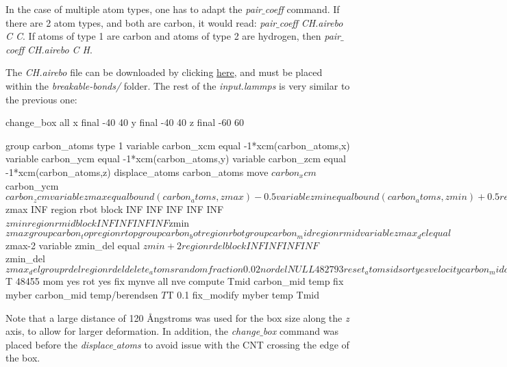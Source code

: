 \begin{tcolorbox}[colback=mylightblue!5!white,colframe=mylightblue!75!black,title=Setting AIREBO pair coefficients]

\vspace{0.25cm} \noindent In the case of multiple atom types, one has to adapt the \textit{pair$\_$coeff} command. 
If there are 2 atom types, and both are carbon, it would read: \textit{pair$\_$coeff } \textit{ CH.airebo C C}.
If atoms of type 1 are carbon and atoms of type 2 are hydrogen, then \textit{pair$\_$coeff } \textit{ CH.airebo C H}.        
\end{tcolorbox}

\noindent The \textit{CH.airebo} file can be
downloaded by clicking \href{https://lammpstutorials.github.io/lammpstutorials-inputs/level1/breaking-a-carbon-nanotube/breakable-bonds/CH.airebo}{here},
and must be placed within the \textit{breakable-bonds/} folder.
The rest of the \textit{input.lammps} is very similar to the previous one:

\begin{lcverbatim}
change_box all x final -40 40 y final -40 40 z final -60 60

group carbon_atoms type 1
variable carbon_xcm equal -1*xcm(carbon_atoms,x)
variable carbon_ycm equal -1*xcm(carbon_atoms,y)
variable carbon_zcm equal -1*xcm(carbon_atoms,z)
displace_atoms carbon_atoms move ${carbon_xcm} ${carbon_ycm} ${carbon_zcm}

variable zmax equal bound(carbon_atoms,zmax)-0.5
variable zmin equal bound(carbon_atoms,zmin)+0.5
region rtop block INF INF INF INF ${zmax} INF
region rbot block INF INF INF INF INF ${zmin}
region rmid block INF INF INF INF ${zmin} ${zmax}

group carbon_top region rtop
group carbon_bot region rbot
group carbon_mid region rmid

variable zmax_del equal ${zmax}-2
variable zmin_del equal ${zmin}+2
region rdel block INF INF INF INF ${zmin_del} ${zmax_del}
group rdel region rdel
delete_atoms random fraction 0.02 no rdel NULL 482793

reset_atoms id sort yes
velocity carbon_mid create ${T} 48455 mom yes rot yes
fix mynve all nve
compute Tmid carbon_mid temp
fix myber carbon_mid temp/berendsen ${T} ${T} 0.1
fix_modify myber temp Tmid
\end{lcverbatim}

\noindent Note that a large distance of 120 Ångstroms was used for the box size along 
the \textit{z} axis, to allow for larger deformation. In addition, the \textit{change$\_$box} command
was placed before the \textit{displace$\_$atoms} to avoid issue with the 
CNT crossing the edge of the box.

